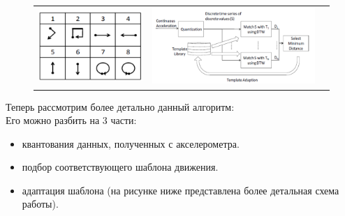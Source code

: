 \begin{figure}[H]
    \begin{center}
        \begin{tabular}{ccc}
            \includegraphics[scale = 0.9]{images/uWave_1.png} & 
            \includegraphics[scale = 0.9]{images/uWave_2.png} \\
        \end{tabular}
    \end{center}
\end{figure}

Теперь рассмотрим более детально данный алгоритм: \\
Его можно разбить на 3 части:
\begin{itemize}
    \item квантования данных, полученных с акселерометра.
    \item подбор соответствующего шаблона движения.
    \item адаптация шаблона (на рисунке ниже представлена более детальная схема работы).
\end{itemize}